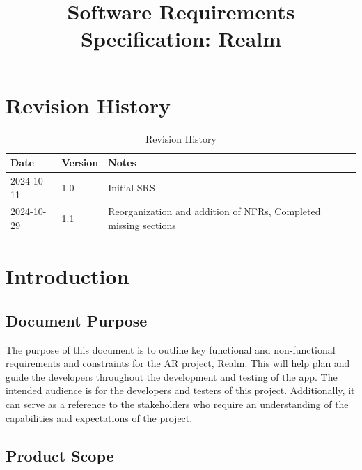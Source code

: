 \documentclass{article}
\title{Software Requirements Specification: Realm\\\progname}
\author{\authname}
\date{}
\begin{document}
\maketitle

\newpage{}

\tableofcontents

\section*{Revision History}

\begin{table}[hp]
    \caption{Revision History} \label{rev_history_table}
    \begin{tabularx}{\textwidth}{p{3cm}p{2cm}X}
        \toprule {\textbf{Date}} & {\textbf{Version}} & {\textbf{Notes}}                                                \\
        \midrule
        2024-10-11               & 1.0                & Initial SRS                                                     \\
        2024-10-29               & 1.1                & Reorganization and addition of NFRs, Completed missing sections \\
        \bottomrule
    \end{tabularx}
\end{table}

\section{Introduction}

\subsection{Document Purpose}

The purpose of this document is to outline key functional and non-functional requirements and constraints for the AR project, Realm. This will help plan and guide the developers throughout the development and testing of the app. The intended audience is for the developers and testers of this project. Additionally, it can serve as a reference to the stakeholders who require an understanding of the capabilities and expectations of the project.

\subsection{Product Scope}
\end{document}
